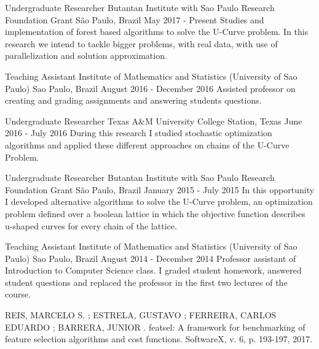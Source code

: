 \documentclass[11pt, a4paper]{awesome-cv-res}
\begin{document}
\begin{cventries}
\cventry
{Undergraduate Researcher}
{Butantan Institute with Sao Paulo Research Foundation Grant}
{São Paulo, Brazil}
{May 2017 - Present}
{Studies and implementation of forest based algorithms to solve the 
U-Curve problem. In this research we intend to tackle bigger problems,
with real data, with use of parallelization and solution approximation.}
\newline 
\newline

\cventry
{Teaching Assistant}
{Institute of Mathematics and Statistics (University of Sao Paulo)}
{Sao Paulo, Brazil}
{August 2016 - December 2016}
{Assisted professor on creating and grading assignments and answering students questions.}
\newline 
\newline

\cventry
{Undergraduate Researcher}
{Texas A\&M University}
{College Station, Texas}
{June 2016 - July 2016}
{During this research I studied stochastic optimization algorithms and applied these different approaches on chains of the U-Curve Problem.}
\newline 
\newline

\cventry
{Undergraduate Researcher}
{Butantan Institute with Sao Paulo Research Foundation Grant}
{São Paulo, Brazil}
{January 2015 - July 2015}
{In this opportunity I developed alternative algorithms to solve the U-Curve problem, an optimization problem defined over a boolean lattice in which the objective function describes u-shaped curves for every chain of the lattice.}
\newline 
\newline

\cventry
{Teaching Assistant}
{Institute of Mathematics and Statistics (University of Sao Paulo)}
{Sao Paulo, Brazil}
{August 2014 - December 2014}
{Professor assistant of Introduction to Computer Science class. I graded student homework, answered student questions and replaced the professor in the first two lectures of the course.}
\end{cventries}
\begin{cventries}
\cventry
    {REIS, MARCELO S. ; ESTRELA, GUSTAVO ; FERREIRA, CARLOS EDUARDO ; BARRERA, JUNIOR . }
    {featsel: A framework for benchmarking of feature selection algorithms and cost functions.}
    {SoftwareX, v. 6, p. 193-197, 2017.}
    {}
    {}
\end{cventries}
\end{document}
